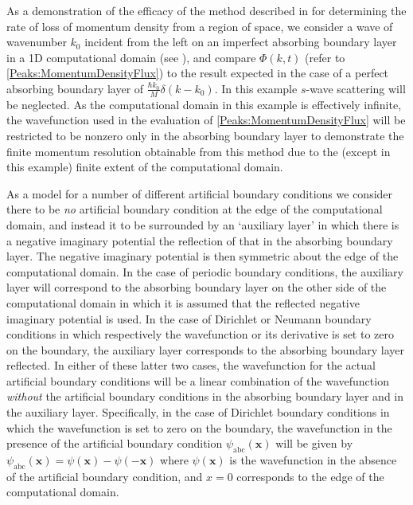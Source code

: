 As a demonstration of the efficacy of the method described in  for determining the rate of loss of momentum density from a region of space, we consider a wave of wavenumber $k_0$ incident from the left on an imperfect absorbing boundary layer in a 1D computational domain (see ), and compare $\Phi(k, t)$ (refer to \eqref{Peaks:MomentumDensityFlux}) to the result expected in the case of a perfect absorbing boundary layer of $\displaystyle \frac{\hbar k_0}{M}\delta(k - k_0)$. In this example $s$-wave scattering will be neglected. As the computational domain in this example is effectively infinite, the wavefunction used in the evaluation of \eqref{Peaks:MomentumDensityFlux} will be restricted to be nonzero only in the absorbing boundary layer to demonstrate the finite momentum resolution obtainable from this method due to the (except in this example) finite extent of the computational domain.

As a model for a number of different artificial boundary conditions we consider there to be \emph{no} artificial boundary condition at the edge of the computational domain, and instead it to be surrounded by an `auxiliary layer' in which there is a negative imaginary potential the reflection of that in the absorbing boundary layer. The negative imaginary potential is then symmetric about the edge of the computational domain. In the case of periodic boundary conditions, the auxiliary layer will correspond to the absorbing boundary layer on the other side of the computational domain in which it is assumed that the reflected negative imaginary potential is used. In the case of Dirichlet or Neumann boundary conditions in which respectively the wavefunction or its derivative is set to zero on the boundary, the auxiliary layer corresponds to the absorbing boundary layer reflected. In either of these latter two cases, the wavefunction for the actual artificial boundary conditions will be a linear combination of the wavefunction \emph{without} the artificial boundary conditions in the absorbing boundary layer and in the auxiliary layer. Specifically, in the case of Dirichlet boundary conditions in which the wavefunction is set to zero on the boundary, the wavefunction in the presence of the artificial boundary condition $\psi_\text{abc}(\bm{x})$ will be given by $\psi_\text{abc}(\bm{x}) = \psi(\bm{x}) - \psi(-\bm{x})$ where $\psi(\bm{x})$ is the wavefunction in the absence of the artificial boundary condition, and $x=0$ corresponds to the edge of the computational domain.

